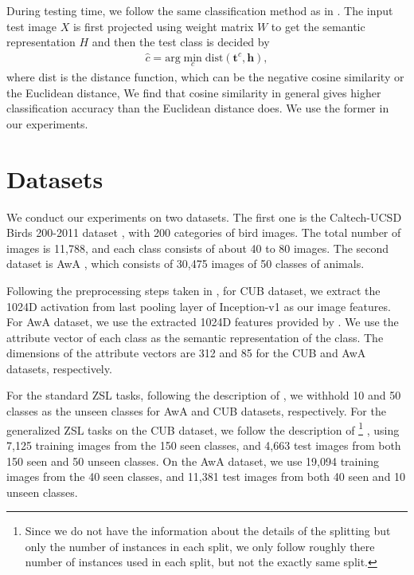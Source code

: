 \documentclass{article}
\newcommand{\bb}[1]{\boldsymbol{#1}}
\begin{document}
During testing time, we follow the same classification method as in \cite{kodirov2017semantic}. The input test image $X$ is first projected using weight matrix $W$ to get the semantic representation $H$ and then the test class is decided by
\begin{align}
	\hat{c} = \textrm{arg} \min_c \textrm{dist}(\bb{t}^c, \bb{h}),
\end{align}
where dist is the distance function, which can be the negative cosine similarity or the Euclidean distance, We find that cosine similarity in general gives higher classification accuracy than the Euclidean distance does. We use the former in our experiments.



\section{Datasets}

We conduct our experiments on two datasets. The first one is the Caltech-UCSD Birds 200-2011 dataset \cite{wah2011caltech}, with 200 categories of bird images. The total number of images is 11,788, and each class consists of about 40 to 80 images. The second dataset is AwA \cite{lampert2014attribute}, which consists of 30,475 images of 50 classes of animals.

Following the preprocessing steps taken in \cite{kodirov2017semantic}, for CUB dataset, we extract the 1024D activation from last pooling layer of Inception-v1 \cite{szegedy2015going} as our image features. For AwA dataset, we use the extracted 1024D features provided by \cite{kodirov2017semantic}. We use the attribute vector of each class as the semantic representation of the class. The dimensions of the attribute vectors are 312 and 85 for the CUB and AwA datasets, respectively.

For the standard ZSL tasks, following the description of \cite{kodirov2017semantic}, we withhold 10 and 50 classes as the unseen classes for AwA and CUB datasets, respectively. For the generalized ZSL tasks on the CUB dataset, we follow the description of \cite{Xian2017}%
\footnote{Since we do not have the information about the details of the splitting but only the number of instances in each split, we only follow roughly there number of instances used in each split, but not the exactly same split.}%
, using 7,125 training images from the 150 seen classes, and 4,663 test images from both 150 seen and 50 unseen classes. On the AwA dataset, we use 19,094 training images from the 40 seen classes, and 11,381 test images from both 40 seen and 10 unseen classes.
\end{document}
